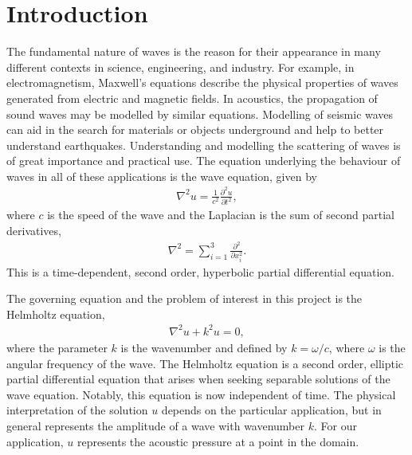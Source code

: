 \chapter{Introduction}


The fundamental nature of waves is the reason for their appearance in many different contexts in science, engineering, and industry.
For example, in electromagnetism, Maxwell's equations describe the physical properties of waves generated from electric and magnetic fields.
In acoustics, the propagation of sound waves may be modelled by similar equations.
Modelling of seismic waves can aid in the search for materials or objects underground and help to better understand earthquakes.
Understanding and modelling the scattering of waves is of great importance and practical use.
The equation underlying the behaviour of waves in all of these applications is the wave equation, given by
\begin{align}
	\nabla^2 u = \frac{1}{c^2}\frac{\partial^2 u}{\partial t^2}, \label{eqn:first}
\end{align}
where $c$ is the speed of the wave and the Laplacian is the sum of second partial derivatives,
\begin{align}
	\nabla^2 = \sum_{i=1}^3 \frac{\partial^2}{\partial x_i^2}.
\end{align}
This is a time-dependent, second order, hyperbolic partial differential equation.

The governing equation and the problem of interest in this project is the Helmholtz equation,
\begin{align}
	\nabla^2 u + k^2 u = 0,
\end{align}
where the parameter $k$ is the wavenumber and defined by $k=\omega/c$, where $\omega$ is the angular frequency of the wave.
The Helmholtz equation is a second order, elliptic partial differential equation that arises when seeking separable solutions of the wave equation.
Notably, this equation is now independent of time.
The physical interpretation of the solution $u$ depends on the particular application, but in general represents the amplitude of a wave with wavenumber $k$.
For our application, $u$ represents the acoustic pressure at a point in the domain.

